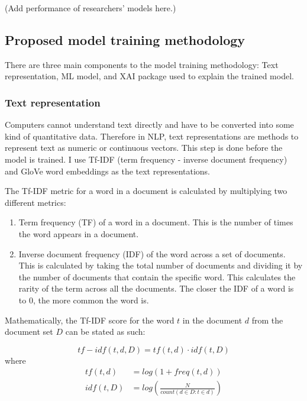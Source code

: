 (Add performance of researchers' models here.)



\subsection{Proposed model training methodology}

There are three main components to the model training methodology: Text representation, ML model, and XAI package used to explain the trained model.


\subsubsection{Text representation}

Computers cannot understand text directly and have to be converted into some kind of quantitative data. Therefore in NLP, text representations are methods to represent text as numeric or continuous vectors. This step is done before the model is trained. I use Tf-IDF (term frequency - inverse document frequency) and GloVe word embeddings as the text representations.

The Tf-IDF metric for a word in a document is calculated by multiplying two different metrics:

\begin{enumerate}
	\item Term frequency (TF) of a word in a document. This is the number of times the word appears in a document.
	\item Inverse document frequency (IDF) of the word across a set of documents. This is calculated by taking the total number of documents and dividing it by the number of documents that contain the specific word. This calculates the rarity of the term across all the documents. The closer the IDF of a word is to 0, the more common the word is.
\end{enumerate}

Mathematically, the Tf-IDF score for the word $t$ in the document $d$ from the document set $D$ can be stated as such:

\[tf-idf(t, d, D) = tf(t, d) \cdot idf(t, D)\]
where 
\begin{align*}
	tf(t, d) &= log(1 + freq(t, d )) \\
	idf(t, D) &= log\left(\frac{N}{count(d \in D : t \in d)}\right)
\end{align*}

